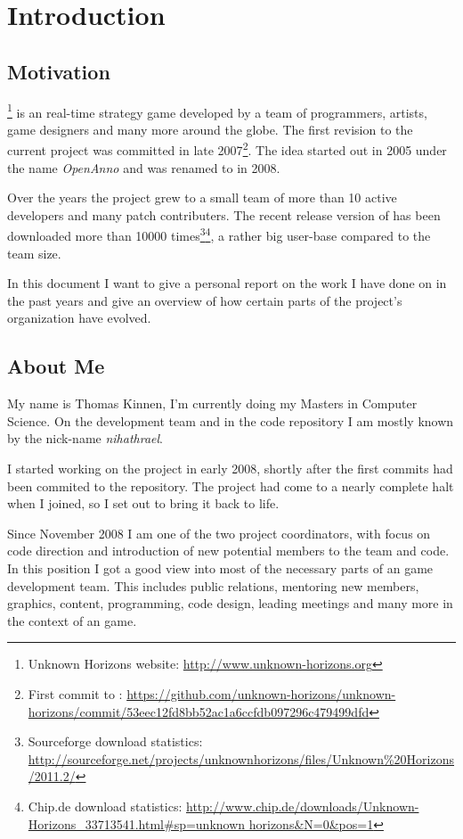 

\section{Introduction}

\subsection{Motivation}
\UH{}\footnote{Unknown Horizons website: \url{http://www.unknown-horizons.org}} is an \OS{} real-time strategy game developed by a team of programmers, artists, game
designers and many more around the globe. The first revision to the current project was committed in late 2007\footnote{First commit to \UH{}:
\url{https://github.com/unknown-horizons/unknown-horizons/commit/53eec12fd8bb52ac1a6ccfdb097296c479499dfd}}. The idea
started out in 2005 under the name \textit{OpenAnno} and was renamed to \UH{} in 2008.

Over the years the project grew to a small team of more than 10 active developers and many
patch contributers. The recent release version of \UH{} has been downloaded more than 10000 times\footnote{Sourceforge
download statistics:
\url{http://sourceforge.net/projects/unknownhorizons/files/Unknown\%20Horizons/2011.2/}}\footnote{Chip.de download
statistics: \url{http://www.chip.de/downloads/Unknown-Horizons_33713541.html\#sp=unknown horizons\&N=0\&pos=1}}, a rather
big user-base compared to the team size.

In this document I want to give a personal report on the work I have done on \UH{} in the past years and give an
overview of how certain parts of the project's organization have evolved.

\subsection{About Me}
My name is Thomas Kinnen, I'm currently doing my Masters in Computer Science. On the development team and in the code
repository I am mostly known by the nick-name \textit{nihathrael}.

I started working on the project in early 2008, shortly after the first commits had been commited to the repository. 
The project had come to a nearly complete halt when I joined, so I set out to bring it back to life.

Since November 2008 I am one of the two project coordinators, with focus on code direction and introduction of new
potential members to the team and code. In this position I got a good view into most of the necessary parts of an \OS{}
game development team. This includes public relations, mentoring new members, graphics, content, programming, code
design, leading meetings and many more in the context of an \OS{} game.

